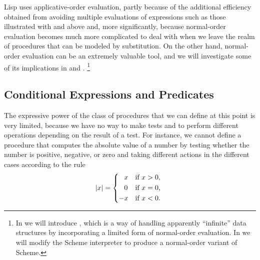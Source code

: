 Lisp uses applicative-order evaluation, partly because of the additional efficiency obtained from avoiding multiple evaluations of expressions such as those illustrated with  and  above and, more significantly, because normal-order evaluation becomes much more complicated to deal with when we leave the realm of procedures that can be modeled by substitution.
On the other hand, normal-order evaluation can be an extremely valuable tool, and we will investigate some of its implications in  and .%
\footnote{
	In  we will introduce , which is a way of handling apparently “infinite” data structures by incorporating a limited form of normal-order evaluation.
	In  we will modify the Scheme interpreter to produce a normal-order variant of Scheme.
}



\subsection{Conditional Expressions and Predicates}
\label{Section 1.1.6}

The expressive power of the class of procedures that we can define at this point is very limited, because we have no way to make tests and to perform different operations depending on the result of a test.
For instance, we cannot define a procedure that computes the absolute value of a number by testing whether the number is positive, negative, or zero and taking different actions in the different cases according to the rule
\[
	\abs{x}
	=
	\begin{cases*}
		\phantom{-}x & if~\( x > 0 \), \\
		\phantom{-}0 & if~\( x = 0 \), \\
		-x           & if~\( x < 0 \).
	\end{cases*}
\]

